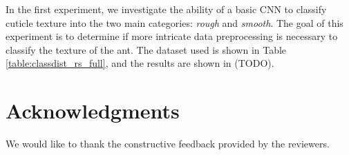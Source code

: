 \documentclass{aci}
\begin{document}
In the first experiment, we investigate the ability of a basic CNN to classify
cuticle texture into the two main categories: \textit{rough} and
\textit{smooth}. The goal of this experiment is to determine if more intricate
data preprocessing is necessary to classify the texture of the ant. The dataset
used is shown in Table \ref{table:classdist_rs_full}, and the results are shown
in (TODO).

\section*{Acknowledgments}
We would like to thank the constructive feedback provided by the reviewers.



\end{document}
